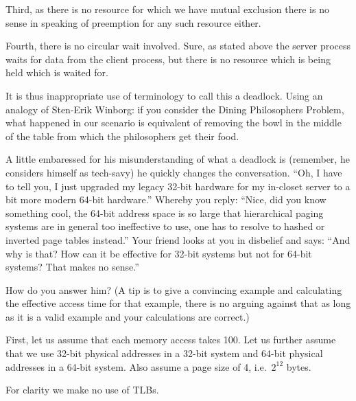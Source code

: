\documentclass[addpoints]{miunexam}
\begin{document}
\begin{questions}
\begin{solution}
    Third, as there is no resource for which we have mutual exclusion there is 
    no sense in speaking of preemption for any such resource either.

    Fourth, there is no circular wait involved.
    Sure, as stated above the server process waits for data from the client 
    process, but there is no resource which is being held which is waited for.

    It is thus inappropriate use of terminology to call this a deadlock.
    Using an analogy of Sten-Erik Winborg: if you consider the Dining 
    Philosophers Problem, what happened in our scenario is equivalent of 
    removing the bowl in the middle of the table from which the philosophers 
    get their food.
  \end{solution}

  \question[6]\label{q:addrspace}
  A little embaressed for his misunderstanding of what a deadlock is (remember, 
  he considers himself as tech-savy) he quickly changes the conversation.
  ``Oh, I have to tell you, I just upgraded my legacy 32-bit hardware for my 
  in-closet server to a bit more modern 64-bit hardware.''
  Whereby you reply: ``Nice, did you know something cool, the 64-bit address 
  space is so large that hierarchical paging systems are in general too 
  ineffective to use, one has to resolve to hashed or inverted page tables 
  instead.''
  Your friend looks at you in disbelief and says: ``And why is that?
  How can it be effective for 32-bit systems but not for 64-bit systems?  That 
  makes no sense.''

  How do you answer him?
  (A tip is to give a convincing example and calculating the effective access 
  time for that example, there is no arguing against that as long as it is 
  a valid example and your calculations are correct.)

  \begin{solution}
    First, let us assume that each memory access takes 
    \unit{100}{\nano\second}.
    Let us further assume that we use 32-bit physical addresses in a 32-bit 
    system and 64-bit physical addresses in a 64-bit system.
    Also assume a page size of \unit{4}{\kibi\byte}, i.e.\ \(2^{12}\) bytes.

    For clarity we make no use of TLBs.


\end{solution}
\end{questions}
\end{document}
